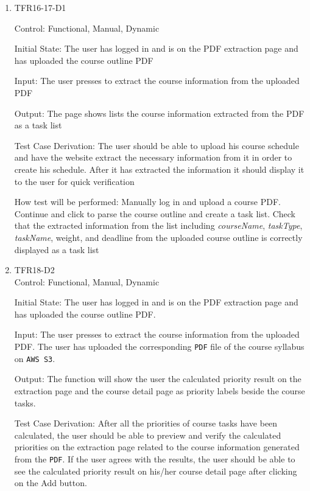 \documentclass[12pt, titlepage]{article}
\begin{document}
  \begin{enumerate}
  
    \item{TFR16-17-D1\\} \label{TFR16-17-D1}

    Control: Functional, Manual, Dynamic
                        
    Initial State: The user has logged in and is on the PDF extraction page and has uploaded the course outline PDF
                        
    Input: The user presses to extract the course information from the uploaded PDF
                        
    Output: The page shows lists the course information extracted from the PDF as a task list
    
    Test Case Derivation: The user should be able to upload his course schedule and have the website extract the necessary information from it in order to create his schedule. After it has extracted the information it should display it to the user for quick verification
                        
    How test will be performed: Manually log in and upload a course PDF. Continue and click to parse the course outline and create a task list. Check that the extracted information from the list including \textit{courseName}, \textit{taskType}, \textit{taskName}, weight, and deadline from the uploaded course outline is correctly displayed as a task list
    
  \item{TFR18-D2\\} \label{TFR18-D2}
  Control: Functional, Manual, Dynamic
            
  Initial State: The user has logged in and is on the PDF extraction page and has uploaded the course outline PDF.
            
  Input: The user presses to extract the course information from the uploaded PDF. The user has uploaded the corresponding \texttt{PDF} file of the course syllabus on \texttt{AWS S3}.
            
  Output: 
  The function will show the user the calculated priority result on the extraction page and the course detail page as priority labels beside the course tasks. 
  
  Test Case Derivation: After all the priorities of course tasks have been calculated, the user should be able to preview and verify the calculated priorities on the extraction page related to the course information generated from the \texttt{PDF}. If the user agrees with the results, the user should be able to see the calculated priority result on his/her course detail page after clicking on the Add button.
  

\end{enumerate}
\end{document}
